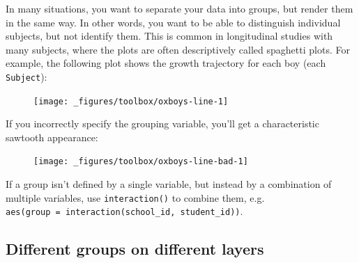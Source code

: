 In many situations, you want to separate your data into groups, but
render them in the same way. In other words, you want to be able to
distinguish individual subjects, but not identify them. This is common
in longitudinal studies with many subjects, where the plots are often
descriptively called spaghetti plots. For example, the following plot
shows the growth trajectory for each boy (each \texttt{Subject}):
 

\begin{Shaded}
\begin{Highlighting}[]
 \StringTok{ }
\StringTok{  }\NormalTok{() +}\StringTok{ }
\StringTok{  }\NormalTok{()}
\end{Highlighting}
\end{Shaded}

\begin{figure}[H]
  \centering
  \texttt{[image: \_figures/toolbox/oxboys-line-1]}
\end{figure}

If you incorrectly specify the grouping variable, you'll get a
characteristic sawtooth appearance:

\begin{Shaded}
\begin{Highlighting}[]
\StringTok{ }
\StringTok{  }\NormalTok{() +}\StringTok{ }
\StringTok{  }\NormalTok{()}
\end{Highlighting}
\end{Shaded}

\begin{figure}[H]
  \centering
  \texttt{[image: \_figures/toolbox/oxboys-line-bad-1]}
\end{figure}

If a group isn't defined by a single variable, but instead by a
combination of multiple variables, use \texttt{interaction()} to combine
them, e.g.
\texttt{aes(group\ =\ interaction(school\_id,\ student\_id))}.

\subsection{Different groups on different layers}

